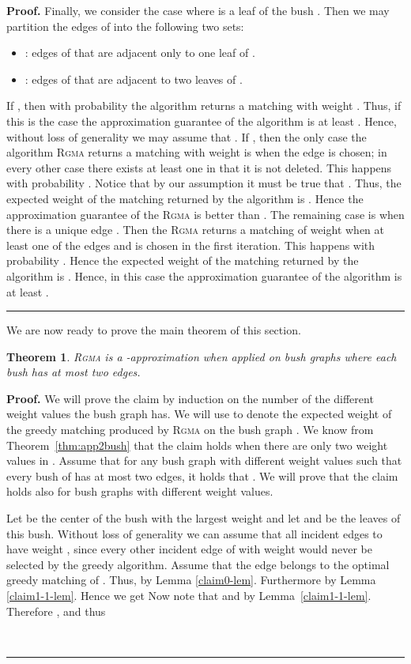\documentclass[a4paper,11pt]{article}
\newtheorem{theorem}{Theorem}
\newenvironment{proof}[1][Proof]{\noindent\textbf{#1.} }{\ \rule{0.5em}{0.5em}}
\newcommand{\rgma}{\textsc{Rgma}\xspace}
\begin{document}
\begin{proof}
Finally, we consider the case where  is a leaf of the bush . Then we 
may partition the edges of  into the following two sets:
\begin{itemize}
\item : edges of  that are adjacent only to one leaf of .
\item : edges of  that are adjacent to two leaves of .
\end{itemize}
If , then with probability  the 
algorithm returns a matching with weight . Thus, if this is the case
the approximation guarantee of the algorithm is at least . Hence,
without loss of generality we may assume that .  If 
, then the only case the algorithm \rgma returns a matching with
weight  is when the edge  is chosen; in every other case there
exists at least one in  that it is not deleted. This happens with 
probability . Notice that by our assumption it must be true 
that . Thus, the expected weight of the matching returned 
by the algorithm is . Hence the approximation guarantee of the \rgma 
is better than . The remaining case is when there is a unique edge 
. Then the \rgma returns a matching of weight  when at 
least one of the edges  and  is chosen in the first iteration. This 
happens with probability . Hence the expected weight of the 
matching returned by the algorithm is . Hence, in this case the 
approximation guarantee of the algorithm is at least .
\end{proof}

\medskip

We are now ready to prove the main theorem of this section.
\begin{theorem}
\label{thm:appbush} \textsc{Rgma}\xspace is a -approximation
when applied on bush graphs where each bush has at most two edges.
\end{theorem}

\begin{proof}
We will prove the claim by induction on the number of the different weight
values  the bush graph  has. We will use  to denote the expected weight of the greedy matching
produced by \textsc{Rgma}\xspace on the bush graph . We know from Theorem~\ref{thm:app2bush} that the claim holds when there are only two weight
values in . Assume that for any bush graph  with  different
weight values such that every bush of  has at most two edges, it holds
that . We
will prove that the claim holds also for bush graphs with  different
weight values.

Let  be the center of the bush with the largest weight  and
let  and  be the leaves of this bush. Without loss of
generality we can assume that all incident edges to  have weight , since every other incident edge of  with weight 
would never be selected by the greedy algorithm. Assume that the edge  belongs to the optimal greedy matching of . Thus,  by
Lemma \ref{claim0-lem}. Furthermore  by Lemma \ref{claim1-1-lem}. Hence we get 
Now note that 
and  by Lemma~\ref{claim1-1-lem}. 
Therefore , and thus

\end{proof}
\end{document}
